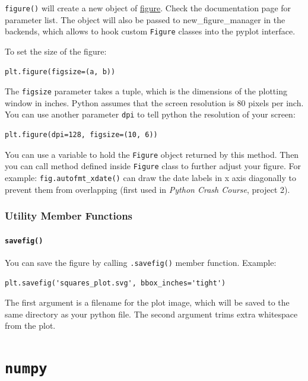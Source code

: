 \documentclass[12pt]{book}
\begin{document}
\texttt{figure()} will create a new object of \href{https://matplotlib.org/3.1.0/api/\_as\_gen/matplotlib.figure.Figure.html\#matplotlib-figure-figure}{figure}. Check the documentation page for parameter list. The object will also be passed to new\_figure\_manager in the backends, which allows to hook custom \texttt{Figure} classes into the pyplot interface.

To set the size of the figure:
\begin{verbatim}
plt.figure(figsize=(a, b))
\end{verbatim}
The \texttt{figsize} parameter takes a tuple, which is the dimensions of the plotting window in inches. Python assumes that the screen resolution is 80 pixels per inch. You can use another parameter \texttt{dpi} to tell python the resolution of your screen:
\begin{verbatim}
plt.figure(dpi=128, figsize=(10, 6))
\end{verbatim}

You can use a variable to hold the \texttt{Figure} object returned by this method. Then you can call method defined inside \texttt{Figure} class to further adjust your figure. For example: \texttt{fig.autofmt\_xdate()} can draw the date labels in x axis diagonally to prevent them from overlapping (first used in \emph{Python Crash Course}, project 2).

\subsection{Utility Member Functions}
\label{sec:org7e84e2b}
\subsubsection{\texttt{savefig()}}
\label{sec:org90a128b}
You can save the figure by calling \texttt{.savefig()} member function. Example:
\begin{verbatim}
plt.savefig('squares_plot.svg', bbox_inches='tight')
\end{verbatim}
The first argument is a filename for the plot image, which will be saved to the same directory as your python file. The second argument trims extra whitespace from the plot.
\chapter{\texttt{numpy}}
\label{sec:org14a24c4}
\end{document}
